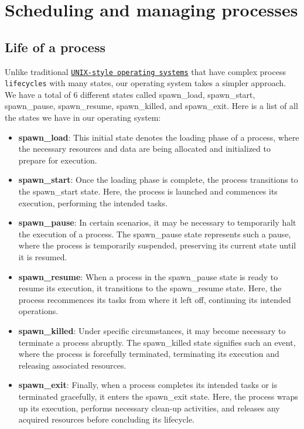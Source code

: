 \section{Scheduling and managing processes}

\subsection{Life of a process}

Unlike traditional \href{https://en.wikipedia.org/wiki/Unix-like}{\texttt{UNIX-style operating systems}} that have complex process \texttt{lifecycles} with many states, our operating system takes a simpler approach. We have a total of 6 different states called spawn\_load, spawn\_start, spawn\_pause, spawn\_resume, spawn\_killed, and spawn\_exit. Here is a list of all the states we have in our operating system:

\begin{itemize}
    \item \textbf{spawn\_load}: This initial state denotes the loading phase of a process, where the necessary resources and data are being allocated and initialized to prepare for execution.

    \item \textbf{spawn\_start}: Once the loading phase is complete, the process transitions to the spawn\_start state. Here, the process is launched and commences its execution, performing the intended tasks.

    \item \textbf{spawn\_pause}: In certain scenarios, it may be necessary to temporarily halt the execution of a process. The spawn\_pause state represents such a pause, where the process is temporarily suspended, preserving its current state until it is resumed.

    \item \textbf{spawn\_resume}: When a process in the spawn\_pause state is ready to resume its execution, it transitions to the spawn\_resume state. Here, the process recommences its tasks from where it left off, continuing its intended operations.

    \item \textbf{spawn\_killed}: Under specific circumstances, it may become necessary to terminate a process abruptly. The spawn\_killed state signifies such an event, where the process is forcefully terminated, terminating its execution and releasing associated resources.

    \item \textbf{spawn\_exit}: Finally, when a process completes its intended tasks or is terminated gracefully, it enters the spawn\_exit state. Here, the process wraps up its execution, performs necessary clean-up activities, and releases any acquired resources before concluding its lifecycle.
\end{itemize}

